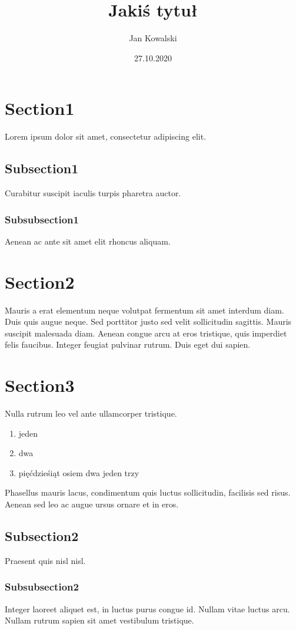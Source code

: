 \documentclass[11pt,a4paper,nottitlepage,]{article}
\title{Jakiś tytuł}
\author{Jan Kowalski}
\date{27.10.2020}
\begin{document}
\maketitle
\section{Section1}
Lorem ipsum dolor sit amet, consectetur adipiscing elit.
\subsection{Subsection1}
Curabitur suscipit iaculis turpis pharetra auctor.
\subsubsection{Subsubsection1}
Aenean ac ante 
sit amet elit rhoncus aliquam.
\section{Section2}
Mauris a erat elementum neque volutpat fermentum sit amet interdum diam. Duis quis augue neque.
Sed porttitor justo sed velit sollicitudin sagittis. Mauris suscipit malesuada diam. Aenean congue arcu at eros tristique, 
quis imperdiet felis faucibus. Integer feugiat pulvinar rutrum. Duis eget dui sapien.%
\section{Section3} 
Nulla rutrum leo vel ante ullamcorper 
tristique.
\begin{enumerate}
\item jeden
\item dwa
\item pięćdzieśiąt osiem dwa jeden trzy
\end{enumerate}
Phasellus mauris lacus, condimentum quis luctus sollicitudin, facilisis sed risus. 
Aenean sed leo ac augue 
ursus ornare et in eros. 
\subsection{Subsection2}
Praesent quis nisl nisl. 
\subsubsection{Subsubsection2}
Integer laoreet aliquet est, in luctus purus congue id. Nullam 
vitae luctus arcu. Nullam rutrum sapien sit amet vestibulum tristique.
\tableofcontents
\end{document}
